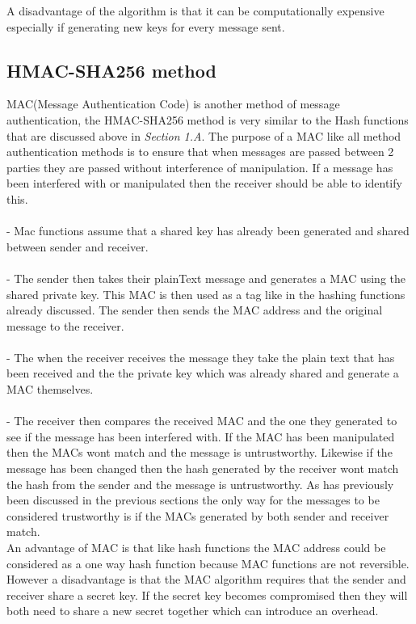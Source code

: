 \documentclass[a4paper, twoside, 11pt]{article}
\begin{document}
A disadvantage of the algorithm is that it can be computationally expensive especially if generating new keys for every message sent.


\subsection{HMAC-SHA256 method}
MAC(Message Authentication Code) is another method of message authentication, the HMAC-SHA256 method is very similar to the Hash functions that are discussed above in \textit{Section 1.A}. The purpose of a MAC like all method authentication methods is to ensure that when messages are passed between 2 parties they are passed without interference of manipulation. If a message has been interfered with or manipulated then the receiver should be able to identify this.\\
\\
 - Mac functions assume that a shared key has already been generated and shared between sender and receiver. \\
\\
 - The sender then takes their plainText message and generates a MAC  using the shared private key. This MAC is then used as a tag like in the hashing functions already discussed. The sender then sends the MAC address and the original message to the receiver.\\
\\
 - The when the receiver receives the message they take the plain text that has been received and the  the private key which was already shared and generate a MAC themselves.\\
\\
 - The receiver then compares the received MAC and the one they generated to see if the message has been interfered with. If the MAC has been manipulated then the MACs wont match and the message is untrustworthy. Likewise if the message has been changed then the hash generated by the receiver wont match the hash from the sender and the message is untrustworthy. As has previously been discussed in the previous sections the only way for the messages to be considered trustworthy is if the MACs generated by both sender and receiver match. \\

An advantage of MAC is that like hash functions the MAC address could be considered as a one way hash function because MAC functions are not reversible. However a disadvantage is that the MAC algorithm requires that the sender and receiver share a secret key. If the secret key becomes compromised then they will both need to share a new secret together which can introduce an overhead. 
\end{document}
